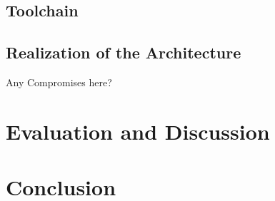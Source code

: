 \documentclass[language=english,noinputenc]{wiwwuwordrprt}
\begin{document}
    \section{Toolchain} %
    \label{sec:toolchain}
    

    \section{Realization of the Architecture} %
    \label{sec:realization_of_the_architecture}
    Any Compromises here?
  

  \chapter{Evaluation and Discussion} %
  \label{cha:evaluation}
  

  \chapter{Conclusion} %
  \label{cha:conclusion}
  
  
  
  
\end{document}
